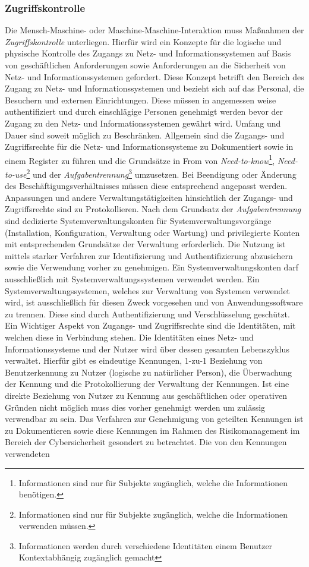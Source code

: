 \documentclass[11pt,a4paper,hidelinks]{article}   %
\begin{document}
            \subsubsection{Zugriffskontrolle}
            Die Mensch-Maschine- oder Maschine-Maschine-Interaktion muss Maßnahmen der \emph{Zugriffskontrolle} unterliegen. Hierfür wird ein Konzepte für die logische und physische Kontrolle des Zugangs zu Netz- und Informationssystemen auf Basis von geschäftlichen Anforderungen sowie Anforderungen an die Sicherheit von Netz- und Informationssystemen gefordert. Diese Konzept betrifft den Bereich des Zugang zu Netz- und Informationssystemen und bezieht sich auf das Personal, die Besuchern und externen Einrichtungen. Diese müssen in angemessen weise authentifiziert und durch einschlägige Personen genehmigt werden bevor der Zugang zu den Netz- und Informationssystemen gewährt wird. Umfang und Dauer sind soweit möglich zu Beschränken. Allgemein sind die Zugangs- und Zugriffsrechte für die Netz- und Informationssysteme zu Dokumentiert sowie in einem Register zu führen und die Grundsätze in From von \emph{Need-to-know}\footnote{Informationen sind nur für Subjekte zugänglich, welche die Informationen benötigen.}, \emph{Need-to-use}\footnote{Informationen sind nur für Subjekte zugänglich, welche die Informationen verwenden müssen.} und der \emph{Aufgabentrennung}\footnote{Informationen werden durch verschiedene Identitäten einem Benutzer Kontextabhängig zugänglich gemacht} umzusetzen. Bei Beendigung oder Änderung des Beschäftigungsverhältnisses müssen diese entsprechend angepasst werden. Anpassungen und andere Verwaltungstätigkeiten hinsichtlich der Zugangs- und Zugriffsrechte sind zu Protokollieren. Nach dem Grundsatz der \emph{Aufgabentrennung} sind dedizierte Systemverwaltungskonten für Systemverwaltungsvorgänge (Installation, Konfiguration, Verwaltung oder Wartung) und privilegierte Konten mit entsprechenden Grundsätze der Verwaltung erforderlich. Die Nutzung ist mittels starker Verfahren zur Identifizierung und Authentifizierung abzusichern sowie die Verwendung vorher zu genehmigen. Ein Systemverwaltungskonten darf ausschließlich mit Systemverwaltungssystemen verwendet werden. Ein Systemverwaltungssystemen, welches zur Verwaltung von Systemen verwendet wird, ist ausschließlich für diesen Zweck vorgesehen und von Anwendungssoftware zu trennen. Diese sind durch Authentifizierung und Verschlüsselung geschützt. Ein Wichtiger Aspekt von Zugangs- und Zugriffsrechte sind die Identitäten, mit welchen diese in Verbindung stehen. Die Identitäten eines Netz- und Informationssysteme und der Nutzer wird über dessen gesamten Lebenszyklus verwaltet. Hierfür gibt es eindeutige Kennungen, 1-zu-1 Beziehung von Benutzerkennung zu Nutzer (logische zu natürlicher Person), die Überwachung der Kennung und die Protokollierung der Verwaltung der Kennungen. Ist eine direkte Beziehung von Nutzer zu Kennung aus geschäftlichen oder operativen Gründen nicht möglich muss dies vorher genehmigt werden um zulässig verwendbar zu sein. Das Verfahren zur Genehmigung von geteilten Kennungen ist zu Dokumentieren sowie diese Kennungen im Rahmen des Risikomanagement im Bereich der Cybersicherheit gesondert zu betrachtet. Die von den Kennungen verwendeten 
\end{document}

